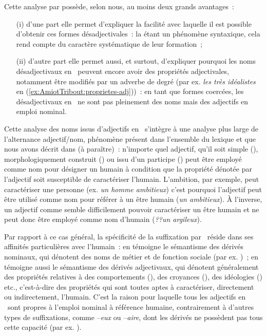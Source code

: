 \documentclass[output=paper]{LSP/langsci}
\begin{document}
  
Cette analyse par  possède, selon nous, au moins deux grands avantages~:
\begin{itemize}
\item[(i)] d'une part elle permet d'expliquer la facilité avec laquelle il est possible d'obtenir ces formes désadjectivales~: la  étant un phénomène syntaxique, cela rend compte du caractère systématique de leur formation~;
\item[(ii)] d'autre part elle permet aussi, et surtout, d'expliquer pourquoi les noms désadjectivaux en \iste\ peuvent encore avoir des propriétés adjectivales, notamment être modifiés par un adverbe de degré (par ex. \textit{les très idéalistes} en (\ref{ex:AmiotTribout:proprietes-adj}))~: en tant que formes coercées, les désadjectivaux en \iste\  ne sont pas pleinement des noms mais des adjectifs en emploi nominal.
\end{itemize}

 
Cette analyse des noms issus d'adjectifs en \iste\  s'intègre à une analyse plus large de l'alternance adjectif/nom,  %
phénomène présent dans l'ensemble du lexique et que nous avons décrit dans \citeauthor{amiottribout17} (à paraître)~: n'importe quel adjectif, qu'il soit  simple (), morphologiquement construit () ou issu d'un participe () peut être employé com\-me nom pour désigner un humain à condition que la propriété dénotée par l'adjectif soit susceptible de caractériser l'humain. L'ambition, par exemple, peut caractériser une personne (ex. \textit{un homme ambitieux}) c'est pourquoi l'adjectif  peut être utilisé comme nom pour référer à un être humain (\textit{un ambitieux}).
À l'inverse, un adjectif comme  semble difficilement pouvoir caractériser un être humain et ne peut donc être employé comme nom d'humain (\textit{??un argileux}).
 

Par rapport à ce cas général, la spécificité de la suffixation par \iste\ réside dans ses affinités particulières avec l'humain~:  en témoigne le sémantisme des dérivés nominaux, qui dénotent des noms de métier et de fonction sociale (par ex. )~; en témoigne aussi le sémantisme des dérivés adjectivaux, qui dénotent généralement des propriétés relatives à des comportements (), des croyances (), des idéologies () etc., c'est-à-dire des propriétés qui sont toutes aptes à caractériser, directement ou indirectement, l'humain. C'est la raison pour laquelle tous les adjectifs en \iste\ sont propres  à l'emploi nominal à référence humaine, contrairement à d'autres types de suffixations, comme  --\textit{eux} ou --\textit{aire}, dont les dérivés ne possèdent pas tous cette capacité (par ex. ).
\end{document}

